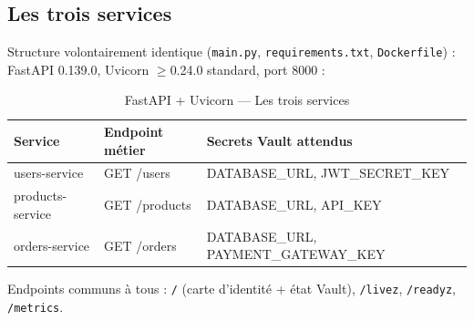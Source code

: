 \documentclass[12pt,a4paper,twoside,openright]{report}
\begin{document}
\subsection{Les trois services}
Structure volontairement identique (\texttt{main.py}, \texttt{requirements.txt}, \texttt{Dockerfile}) : FastAPI 0.139.0, Uvicorn $\geq$0.24.0 standard, port 8000 :

\begin{table}[H]
\centering\small
\caption{FastAPI + Uvicorn --- Les trois services}\label{tab:ch-fastapi-uvicorn-les-trois-services}
\begin{tabular}{@{}llp{8.2cm}@{}}
\toprule
\textbf{Service} & \textbf{Endpoint métier} & \textbf{Secrets Vault attendus} \\
\midrule
users-service & GET /users & DATABASE\_URL, JWT\_SECRET\_KEY \\
products-service & GET /products & DATABASE\_URL, API\_KEY \\
orders-service & GET /orders & DATABASE\_URL, PAYMENT\_GATEWAY\_KEY \\
\bottomrule
\end{tabular}
\end{table}

Endpoints communs à tous : \texttt{/} (carte d'identité + état Vault), \texttt{/livez}, \texttt{/readyz}, \texttt{/metrics}.
\end{document}
